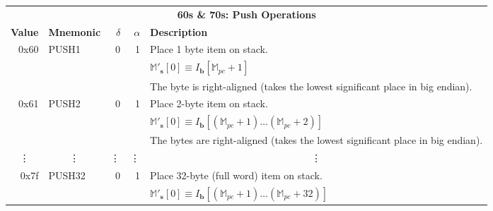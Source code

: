 \documentclass[9pt,oneside]{amsart}
\begin{document}
\begin{tabular*}{\columnwidth}[h]{rlrrl}
\toprule
\multicolumn{5}{c}{\textbf{60s \& 70s: Push Operations}} \vspace{5pt} \\
\textbf{Value} & \textbf{Mnemonic} & $\delta$ & $\alpha$ & \textbf{Description} \vspace{5pt} \\
0x60 & {\small PUSH1} & 0 & 1 & Place 1 byte item on stack. \\
&&&& $\mathbb{M}'_\mathbf{s}[0] \equiv I_\mathbf{b}[\mathbb{M}_{pc} + 1]$ \\
&&&& The byte is right-aligned (takes the lowest significant place in big endian). \\
\midrule
0x61 & {\small PUSH2} & 0 & 1 & Place 2-byte item on stack. \\
&&&& $\mathbb{M}'_\mathbf{s}[0] \equiv I_\mathbf{b}[(\mathbb{M}_{pc} + 1) \dots (\mathbb{M}_{pc} + 2) ]$ \\
&&&& The bytes are right-aligned (takes the lowest significant place in big endian). \\
\midrule
\multicolumn{1}{c}{\vdots} & \multicolumn{1}{c}{\vdots} & \vdots & \vdots & \multicolumn{1}{c}{\vdots} \\
\midrule
0x7f & {\small PUSH32} & 0 & 1 & Place 32-byte (full word) item on stack. \\
&&&& $\mathbb{M}'_\mathbf{s}[0] \equiv I_\mathbf{b}[(\mathbb{M}_{pc} + 1) \dots (\mathbb{M}_{pc} + 32) ]$ \\
\bottomrule
\end{tabular*}
\end{document}
